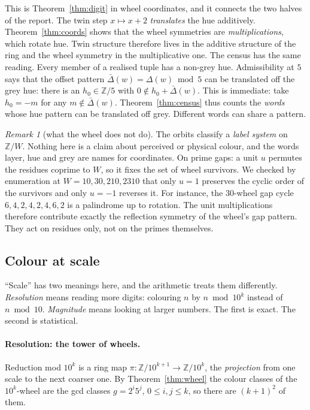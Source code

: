 \documentclass[11pt]{article}
\newcommand{\Z}{\mathbb Z}
\theoremstyle{plain}
\theoremstyle{definition}
\theoremstyle{remark}
\newtheorem{remark}[theorem]{Remark}
\begin{document}
\noindent
This is Theorem~\ref{thm:digit} in wheel coordinates, and it connects the two halves of the report.
The twin step $x\mapsto x+2$ \emph{translates} the hue additively. Theorem~\ref{thm:coords} shows
that the wheel symmetries are \emph{multiplications}, which rotate hue. Twin structure therefore
lives in the additive structure of the ring and the wheel symmetry in the multiplicative one. The
census has the same reading. Every member of a realised tuple has a non-grey hue. Admissibility at
$5$ says that the offset pattern $\bar\Delta(w)=\Delta(w)\bmod5$ can be translated off the grey hue:
there is an $h_0\in\Z/5$ with $0\notin h_0+\bar\Delta(w)$. This is immediate: take $h_0=-m$ for any
$m\notin\bar\Delta(w)$. Theorem~\ref{thm:census} thus counts the \emph{words} whose hue pattern can
be translated off grey. Different words can share a pattern.

\begin{remark}[what the wheel does not do]\label{rem:not}
The orbits classify a \emph{label system} on $\Z/W$. Nothing here is a claim about perceived or
physical colour, and the words layer, hue and grey are names for coordinates. On prime gaps: a unit
$u$ permutes the residues coprime to $W$, so it fixes the set of wheel survivors. We checked by
enumeration at $W=10,30,210,2310$ that only $u=1$ preserves the cyclic order of the survivors and
only $u=-1$ reverses it. For instance, the $30$-wheel gap cycle $6,4,2,4,2,4,6,2$ is a palindrome
up to rotation. The unit multiplications therefore contribute exactly the reflection symmetry of the
wheel's gap pattern. They act on residues only, not on the primes themselves.
\end{remark}

\subsection{Colour at scale}\label{sec:scale}

``Scale'' has two meanings here, and the arithmetic treats them differently. \emph{Resolution} means
reading more digits: colouring $n$ by $n\bmod 10^k$ instead of $n\bmod 10$. \emph{Magnitude} means
looking at larger numbers. The first is exact. The second is statistical.

\paragraph{Resolution: the tower of wheels.} Reduction mod $10^k$ is a ring map
$\pi:\Z/10^{k+1}\to\Z/10^{k}$, the \emph{projection} from one scale to the next coarser one. By
Theorem~\ref{thm:wheel} the colour classes of the $10^k$-wheel are the gcd classes
$g=2^i5^j$, $0\le i,j\le k$, so there are $(k+1)^2$ of them.
\end{document}

